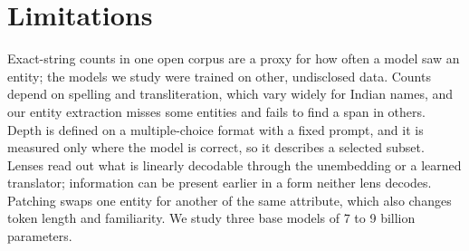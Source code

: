 \section*{Limitations}

Exact-string counts in one open corpus are a proxy for how often a model saw an entity; the models we study were trained on other, undisclosed data.
Counts depend on spelling and transliteration, which vary widely for Indian names, and our entity extraction misses some entities and fails to find a span in others.
Depth is defined on a multiple-choice format with a fixed prompt, and it is measured only where the model is correct, so it describes a selected subset.
Lenses read out what is linearly decodable through the unembedding or a learned translator; information can be present earlier in a form neither lens decodes.
Patching swaps one entity for another of the same attribute, which also changes token length and familiarity.
We study three base models of 7 to 9 billion parameters.
